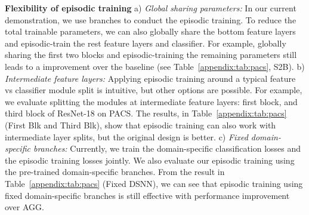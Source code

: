 \documentclass[10pt,twocolumn,letterpaper]{article}
\newcommand{\keypoint}[1]{\vspace{0.1cm}\noindent\textbf{#1}\quad}
\begin{document}
\keypoint{Flexibility of episodic training} a) \emph{Global sharing parameters:} In our current demonstration, we use  branches to conduct the episodic training. To reduce the total trainable parameters, we can also globally share the bottom feature layers and episodic-train the rest feature layers and classifier. For example, globally sharing the first two blocks and episodic-training the remaining parameters still leads to a  improvement over the baseline (see Table~\ref{appendix:tab:pacs}, S2B). b) \emph{Intermediate feature layers:} Applying episodic training around a typical feature vs classifier module split is intuitive, but other options are possible. For example, we evaluate splitting the modules at intermediate feature layers: first block, and third block of ResNet-18 on PACS. The results, in Table~\ref{appendix:tab:pacs} (First Blk and Third Blk), show that episodic training can also work with intermediate layer splits, but the original design is better. c) \emph{Fixed domain-specific branches:} Currently, we train the domain-specific classification losses and the episodic training losses jointly. We also evaluate our episodic training using the pre-trained domain-specific branches. From the result in Table~\ref{appendix:tab:pacs} (Fixed DSNN), we can see that episodic training using fixed domain-specific branches is still effective with  performance improvement over AGG.
\end{document}
